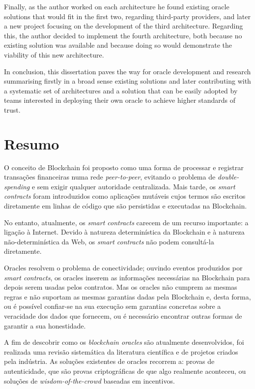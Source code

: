 Finally, as the author worked on each architecture he found existing oracle solutions that would fit in the first two, regarding third-party providers, and later a new project focusing on the development of the third architecture. Regarding this, the author decided to implement the fourth architecture, both because no existing solution was available and because doing so would demonstrate the viability of this new architecture.

In conclusion, this dissertation paves the way for oracle development and research summarising firstly in a broad sense existing solutions and later contributing with a systematic set of architectures and a solution that can be easily adopted by teams interested in deploying their own oracle to achieve higher standards of trust.


\chapter*{Resumo}


O conceito de Blockchain foi proposto como uma forma de processar e registrar transações financeiras numa rede \textit{peer-to-peer}, evitando o problema de \textit{double-spending} e sem exigir qualquer autoridade centralizada. Mais tarde, os \textit{smart contracts} foram introduzidos como aplicações mutáveis cujos termos são escritos diretamente em linhas de código que são persistidas e executadas na Blockchain.


No entanto, atualmente, os \textit{smart contracts} carecem de um recurso importante: a ligação à Internet. Devido à natureza determinística da Blockchain e à natureza não-determinística da Web, os \textit{smart contracts} não podem consultá-la diretamente.

Oracles resolvem o problema de conectividade; ouvindo eventos produzidos por \textit{smart contracts}, os oracles inserem as informações necessárias na Blockchain para depois serem usadas pelos contratos. Mas os oracles não cumprem as mesmas regras e não suportam as mesmas garantias dadas pela Blockchain e, desta forma, ou é possível confiar-se na sua execução sem garantias concretas sobre a veracidade dos dados que fornecem, ou é necessário encontrar outras formas de garantir a sua honestidade.

A fim de descobrir como os \textit{blockchain oracles} são atualmente desenvolvidos, foi realizada uma revisão sistemática da literatura científica e de projetos criados pela indústria. As soluções existentes de oracles recorrem a: provas de autenticidade, que são provas criptográficas de que algo realmente aconteceu, ou soluções de \textit{wisdom-of-the-crowd} baseadas em incentivos.

